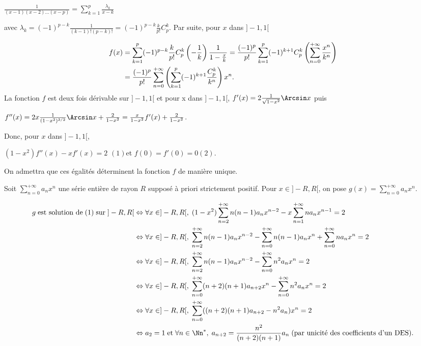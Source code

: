 {{\begin{center}
$\frac{1}{(x-1)(x-2)\ldots(x-p)}=\sum_{k=1}^{p}\frac{\lambda_k}{x-k}$
\end{center}

avec $\lambda_k=(-1)^{p-k}\frac{1}{(k-1)!(p-k)!}= (-1)^{p-k}\frac{k}{p!}C_p^k$.
Par suite, pour $x$ dans $]-1,1[$

\begin{align*}\ensuremath
f(x)&=\sum_{k=1}^{p}(-1)^{p-k}\frac{k}{p!}C_p^k\left(-\frac{1}{k}\right)\frac{1}{1-\frac{x}{k}}=\frac{(-1)^p}{p!}\sum_{k=1}^{p} (-1)^{k+1}C_p^k\left(\sum_{n=0}^{+\infty}\frac{x^n}{k^n}\right)\\
 &=\frac{(-1)^p}{p!}\sum_{n=0}^{+\infty}\left(\sum_{k=1}^{p}(-1)^{k+1}\frac{C_p^k}{k^n}\right)x^n.
\end{align*}
La fonction $f$ est deux fois dérivable sur $]-1,1[$ et pour x dans $]-1,1[$, $f'(x) =2\frac{1}{\sqrt{1-x^2}}\Arcsin x$ puis

\begin{center}
$f''(x) =2x\frac{1}{(1-x^2)^{3/2}}\Arcsin x+\frac{2}{1-x^2}=\frac{x}{1-x^2}f'(x)+\frac{2}{1-x^2}$.
\end{center}

Donc, pour $x$ dans $]-1,1[$,

\begin{center}
$(1-x^2)f''(x)-xf'(x)=2$ \quad$(1)$\quad et $f(0)=f'(0) = 0$\quad$(2)$.
\end{center}

On admettra que ces égalités déterminent la fonction $f$ de manière unique.

Soit $\sum_{n=0}^{+\infty}a_nx^n$ une série entière de rayon $R$ supposé à priori strictement positif. Pour $x\in]-R,R[$, on pose $g(x)=\sum_{n=0}^{+\infty}a_nx^n$.

\begin{align*}\ensuremath
g\;\text{est solution de}\;(1)\;\text{sur}\;]-R,R[&\Leftrightarrow\forall x\in]-R,R[,\;(1-x^2)  \sum_{n=2}^{+\infty}n(n-1)a_nx^{n-2} -x\sum_{n=1}^{+\infty}na_nx^{n-1}=2\\
 &\Leftrightarrow \forall x\in]-R,R[,\;\sum_{n=2}^{+\infty}n(n-1)a_nx^{n-2}-\sum_{n=0}^{+\infty}n(n-1)a_nx^n+\sum_{n=0}^{+\infty}na_nx^n= 2\\
 &\Leftrightarrow \forall x\in]-R,R[,\;\sum_{n=2}^{+\infty}n(n-1)a_nx^{n-2}-\sum_{n=0}^{+\infty}n^2a_nx^n = 2\\
 &\Leftrightarrow \forall x\in]-R,R[,\;\sum_{n=0}^{+\infty}(n+2)(n+1)a_{n+2}x^{n}-\sum_{n=0}^{+\infty}n^2a_nx^n = 2\\
 &\Leftrightarrow\forall x\in]-R,R[,\;\sum_{n=0}^{+\infty}((n+2)(n+1)a_{n+2}-n^2a_n)x^{n}= 2\\
 &\Leftrightarrow a_2=1\;\text{et}\;\forall n\in\Nn^*,\;a_{n+2}=\frac{n^2}{(n+2)(n+1)}a_n\;(\text{par unicité des coefficients d'un DES}).
\end{align*}

}}
